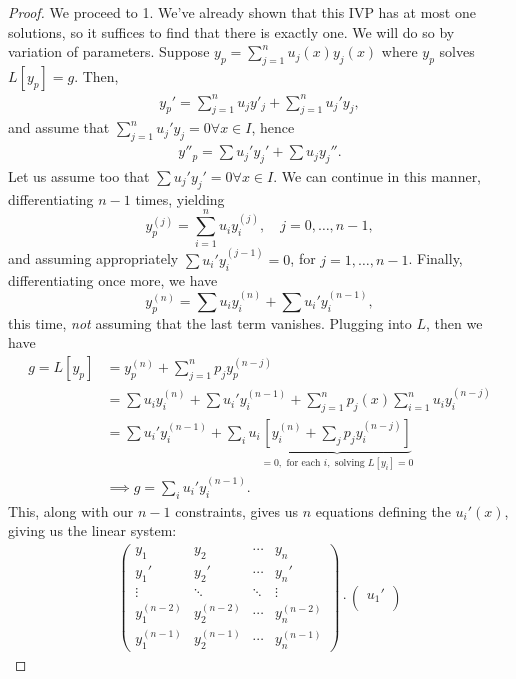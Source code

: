 \begin{proof}
    We proceed to 1. We've already shown that this IVP has at most one solutions, so it suffices to find that there is exactly one. We will do so by variation of parameters. Suppose $y_p = \sum_{j=1}^n u_j(x) y_j(x)$ where $y_p$ solves $L[y_p] = g$. Then, \begin{align*}
        y_{p}' = \sum_{j=1}^n u_j y'_j + \sum_{j=1}^n u_j' y_j,
    \end{align*}
    and assume that $\sum_{j=1}^n u_j' y_j = 0 \forall x \in I$, hence \begin{align*}
        y''_p = \sum u_j'y_j' + \sum u_j y_j''.
    \end{align*}
    Let us assume too that $\sum u_j'y_j' = 0 \forall x \in I$. We can continue in this manner, differentiating $n-1$ times, yielding \[
    y_p^{(j)}     = \sum_{i=1}^n u_i y_i^{(j)}, \quad j = 0, \dots, n - 1,
    \]
    and assuming appropriately $\sum u_i' y_i^{(j-1)} = 0$, for $j = 1, \dots, n - 1$. Finally, differentiating once more, we have \[
    y_p^(n) = \sum u_i y_i^{(n)} + \sum u_i' y_i^{(n-1)},    
    \]
    this time, \emph{not} assuming that the last term vanishes. Plugging into $L$, then we have \begin{align*}
    g = L[y_p] &= y_p^{(n)} + \sum_{j=1}^n p_j y_p^{(n-j)}\\
    &= \sum u_i y_i^{(n)} + \sum u_i' y_i^{(n-1)} + \sum_{j=1}^n p_j(x) \sum_{i=1}^n u_i y_i^{(n-j)}\\
    &= \sum u_i'y_i^{(n-1)} + \sum_{i} u_i \underbrace{\left[y_i^{(n)} + \sum_j p_j y_i^{(n-j)}\right]}_{= 0, \text{ for each }i, \text{ solving } L[y_i] = 0}\\
    &\implies g = \sum_i u_i' y_i^{(n-1)}.
    \end{align*}
    This, along with our $n - 1$ constraints, gives us $n$ equations  defining the $u_i'(x)$, giving us the linear system:
    \begin{align*}
        \begin{pmatrix}
            y_1 & y_2 & \cdots & y_n\\
            y_1' & y_2' & \cdots & y_n'\\
            \vdots & \ddots & \ddots & \vdots \\
            y_1^{(n-2)} & y_2^{(n-2)} & \cdots & y_n^{(n-2)}\\
            y_1^{(n-1)} & y_2^{(n-1)} & \cdots & y_n^{(n-1)}
        \end{pmatrix} \cdot \begin{pmatrix}
            u_1'\\

\end{pmatrix}
\end{align*}
\end{proof}
